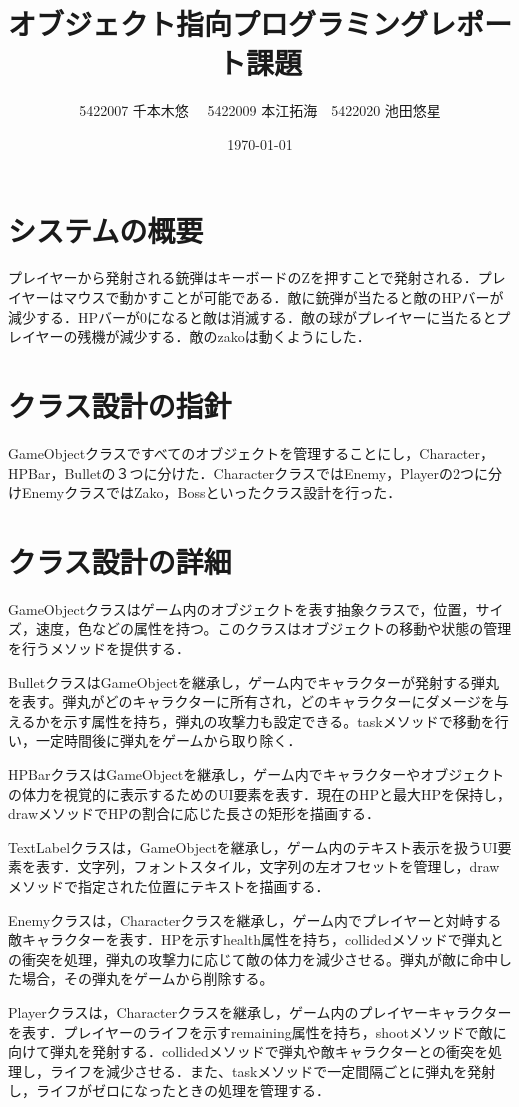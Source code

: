 \documentclass[dvipdfmx]{jlreq}
\title{オブジェクト指向プログラミングレポート課題}
\author{5422007 千本木悠
　5422009 本江拓海　5422020 池田悠星}
\date{\today}
\begin{document}
\maketitle

\section{システムの概要}
プレイヤーから発射される銃弾はキーボードのZを押すことで発射される．プレイヤーはマウスで動かすことが可能である．敵に銃弾が当たると敵のHPバーが減少する．HPバーが0になると敵は消滅する．敵の球がプレイヤーに当たるとプレイヤーの残機が減少する．敵のzakoは動くようにした．

\section{クラス設計の指針}
GameObjectクラスですべてのオブジェクトを管理することにし，Character，HPBar，Bulletの３つに分けた．CharacterクラスではEnemy，Playerの2つに分けEnemyクラスではZako，Bossといったクラス設計を行った．

\section{クラス設計の詳細}
GameObjectクラスはゲーム内のオブジェクトを表す抽象クラスで，位置，サイズ，速度，色などの属性を持つ。このクラスはオブジェクトの移動や状態の管理を行うメソッドを提供する．

BulletクラスはGameObjectを継承し，ゲーム内でキャラクターが発射する弾丸を表す。弾丸がどのキャラクターに所有され，どのキャラクターにダメージを与えるかを示す属性を持ち，弾丸の攻撃力も設定できる。taskメソッドで移動を行い，一定時間後に弾丸をゲームから取り除く．

HPBarクラスはGameObjectを継承し，ゲーム内でキャラクターやオブジェクトの体力を視覚的に表示するためのUI要素を表す．現在のHPと最大HPを保持し，drawメソッドでHPの割合に応じた長さの矩形を描画する．

TextLabelクラスは，GameObjectを継承し，ゲーム内のテキスト表示を扱うUI要素を表す．文字列，フォントスタイル，文字列の左オフセットを管理し，draw メソッドで指定された位置にテキストを描画する．

Enemyクラスは，Characterクラスを継承し，ゲーム内でプレイヤーと対峙する敵キャラクターを表す．HPを示すhealth属性を持ち，collidedメソッドで弾丸との衝突を処理，弾丸の攻撃力に応じて敵の体力を減少させる。弾丸が敵に命中した場合，その弾丸をゲームから削除する。

Playerクラスは，Characterクラスを継承し，ゲーム内のプレイヤーキャラクターを表す．プレイヤーのライフを示すremaining属性を持ち，shootメソッドで敵に向けて弾丸を発射する．collidedメソッドで弾丸や敵キャラクターとの衝突を処理し，ライフを減少させる．また、taskメソッドで一定間隔ごとに弾丸を発射し，ライフがゼロになったときの処理を管理する．
\end{document}
